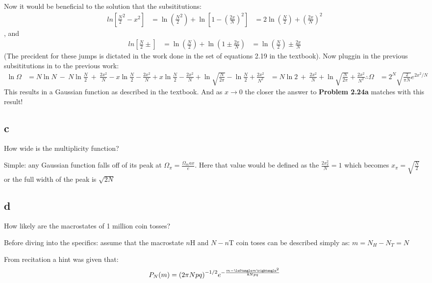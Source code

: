 \documentclass[a4paper,floatfix,nofootinbib]{article}
\begin{document}
Now it would be beneficial to the solution that the subsititutions:
\begin{align*}
    ln \left[ {\frac{N}{2}}^2 - x^2 \right] &= \ln \left( { \frac{N}{2} }^2 \right) + \ln  \left[ 1 - {\left( \frac{2x}{N} \right)}^2 \right]
    &= 2 \ln \left( \frac{N}{2} \right) + {\left( \frac{2x}{N} \right)}^2
\end{align*}
, and
\begin{align*} 
    ln \left[ \frac{N}{2} \pm \right] &= \ln \left( \frac{N}{2} \right) + \ln \left( 1 \pm \frac{2x}{N} \right)
    &= \ln \left( \frac{N}{2} \right) \pm \frac{2x}{N}
\end{align*}
(The precident for these jumps is dictated in the work done in the set of equations 2.19 in the textbook).
Now pluggin in the previous subsititutions in to the previous work:
\begin{align*}
    \ln \Omega &= N \ln N \ - \ N \ln \frac{N}{2} \ + \ \frac{2 x^2}{N} - x \ln \frac{N}{2} - \frac{2 x^2}{N} + x \ln \frac{N}{2} - \frac{2 x^2}{N} + \ln \sqrt{\frac{N}{2 \pi}} - \ln \frac{N}{2} + \frac{2 x^2}{N^2}
    &= N \ln 2 \ + \ \frac{2 x^2}{N} + \ln \sqrt{\frac{N}{2 \pi}} + \frac{2 x^2}{N^2}
    \therefore \Omega &= 2^N \sqrt{\frac{2}{\pi N}} e^{2x^2 / N}
\end{align*}
This results in a Gaussian function as described in the textbook. And as $x \rightarrow 0$ the closer the answer to \textbf{Problem 2.24a} matches with this result!

\subsection*{c}
How wide is the multiplicity function?

Simple: any Gaussian function falls off of its peak at ${\Omega}_{\pi} = \frac{{\Omega}_max}{e}$. Here that value would be defined as the $\frac{2x_{\pi}^2}{N} = 1$ which becomes $x_{\pi} = \sqrt{\frac{N}{2}}$ or the full width of the peak is $\sqrt{2N}$

\subsection*{d}
How likely are the macrostates of 1 million coin tosses?

Before diving into the specifics: assume that the macrostate $n$H and $N-n$T coin toses can be described simply as: $m = N_H - N_T = N$ 

From recitation a hint was given that:
\begin{equation*}
    P_N(m) = {\left( 2 \pi N p q \right)}^{-1/2} e^{- \frac{m - {\leftangle m \rightangle}^2}{8 N p q }}
\end{equation*}
\end{document}
